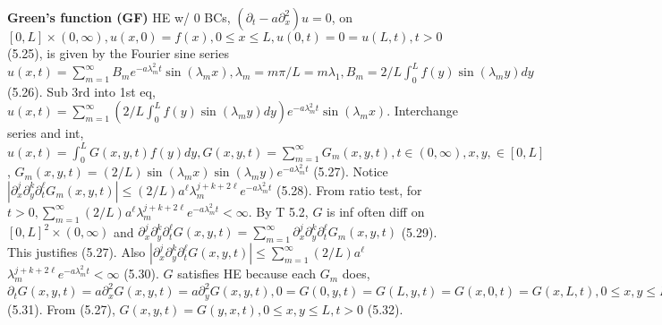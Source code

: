{\bf Green's function (GF)} HE w/ 0 BCs, $(\partial_t - a \partial_x^2)u = 0$, on $[0,L] \times (0, \infty), u(x,0)= f(x), 0 \leq x \leq L, u(0,t) = 0 = u(L, t), t > 0$ (5.25), is given by the Fourier sine series $u(x,t) = \sum_{m=1}^{\infty} B_m e^{-a \lambda_m^2 t} \sin(\lambda_m x), \lambda_m = m \pi / L = m \lambda_1, B_m = 2/L \int_0^L f(y) \sin(\lambda_m y) dy$ (5.26). Sub 3rd into  1st eq, $u(x,t) = \sum_{m=1}^{\infty} (2/L \int_0^L f(y) \sin(\lambda_m y) dy) e^{-a \lambda_m^2 t} \sin(\lambda_m x)$. Interchange series and int, $u(x,t) = \int_0^L G(x,y,t)f(y) dy, G(x,y,t)=\sum_{m=1}^{\infty} G_m(x,y,t), t \in (0, \infty), x,y, \in [0, L]$, $G_m(x,y,t) = (2/L) \sin(\lambda_m x) \sin(\lambda_m y)e^{-a \lambda_m^2 t}$ (5.27). Notice $|\partial_x^j \partial_y^k \partial_t^{\ell} G_m(x,y,t)| \leq (2/L) a^{\ell} \lambda_m^{j+k+2\ell} e^{-a \lambda_m^2 t}$ (5.28). From ratio test, for $t > 0, \sum_{m=1}^{\infty}(2/L) a^{\ell} \lambda_m^{j+k+2\ell} e^{-a \lambda_m^2 t} < \infty$.
By T 5.2, $G$ is inf often diff on $[0, L]^2 \times (0, \infty)$ and $\partial_x^j \partial_y^k \partial_t^{\ell} G(x,y,t) = \sum_{m=1}^{\infty} \partial_x^j \partial_y^k \partial_t^{\ell} G_m(x,y,t)$ (5.29). This justifies (5.27). Also $|\partial_x^j \partial_y^k \partial_t^{\ell} G(x,y,t)| \leq \sum_{m=1}^{\infty} (2/L) a^{\ell}$
$\lambda_m^{j+k+2\ell} e^{-a \lambda_m^2 t} < \infty$ (5.30). $G$ satisfies HE because each $G_m$ does, $\partial_t G(x,y,t) = a \partial_x^2 G(x,y,t) = a \partial_y^2 G(x,y,t), 0 = G(0,y,t) = G(L,y,t)=G(x,0,t) = G(x,L,t), 0 \leq x, y \leq L, t > 0$ (5.31). From (5.27), $G(x,y,t)=G(y,x,t), 0 \leq x, y \leq L, t > 0$ (5.32). 
